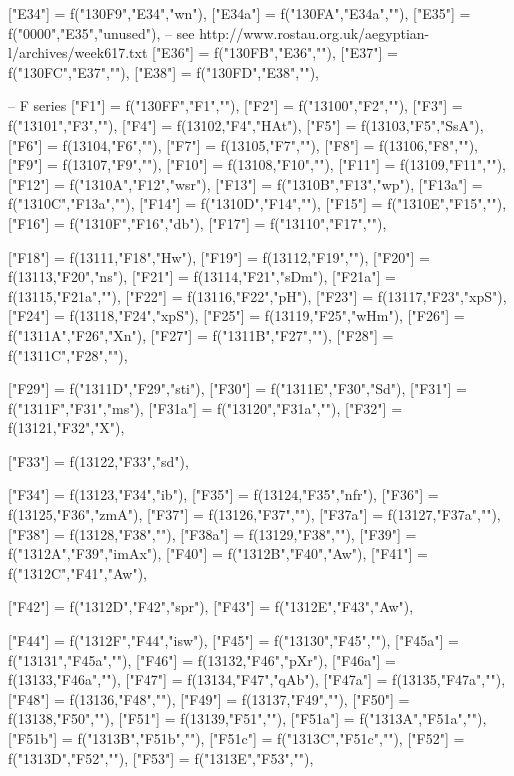 \documentclass{article}
\begin{document}
\begin{luacode*}
{	["E34"] 		= f("130F9","E34","wn"),
	["E34a"] 		= f("130FA","E34a",""),
	["E35"] 		= f("0000","E35","unused"), -- see http://www.rostau.org.uk/aegyptian-l/archives/week617.txt
	["E36"] 		= f("130FB","E36",""),
	["E37"] 		= f("130FC","E37",""),
	["E38"] 		= f("130FD","E38",""),

-- F series
	["F1"] 		    = f("130FF","F1",""),
	["F2"] 		   = f("13100","F2",""),
	["F3"] 		   = f("13101","F3",""),
	["F4"] 		   = f(13102,"F4","HAt"),
	["F5"] 		   = f(13103,"F5","SsA"),
	["F6"] 		   = f(13104,"F6",""),
	["F7"] 		   = f(13105,"F7",""),
	["F8"] 		   = f(13106,"F8",""),
	["F9"] 		   = f(13107,"F9",""),
	["F10"] 		= f(13108,"F10",""),
	["F11"] 		= f(13109,"F11",""),
	["F12"] 		= f("1310A","F12","wsr"),
	["F13"] 		= f("1310B","F13","wp"),
	["F13a"] 		= f("1310C","F13a",""),
	["F14"] 		= f("1310D","F14",""),
	["F15"] 		= f("1310E","F15",""),
	["F16"] 		= f("1310F","F16","db"),
	["F17"] 		= f("13110","F17",""),

	["F18"] 		= f(13111,"F18","Hw"),
	["F19"] 		= f(13112,"F19",""),
	["F20"] 		= f(13113,"F20","ns"),
	["F21"] 		= f(13114,"F21","sDm"),
	["F21a"] 		= f(13115,"F21a",""),
	["F22"] 		= f(13116,"F22","pH"),
	["F23"]       = f(13117,"F23","xpS"),
	["F24"]       = f(13118,"F24","xpS"),
	["F25"]       = f(13119,"F25","wHm"),
	["F26"]       = f("1311A","F26","Xn"),
	["F27"]       = f("1311B","F27",""),
	["F28"]       = f("1311C","F28",""),

	["F29"]       = f("1311D","F29","sti"),
	["F30"]       = f("1311E","F30","Sd"),
	["F31"]       = f("1311F","F31","ms"),
    ["F31a"] = f("13120","F31a",""),
["F32"] = f(13121,"F32","X"),

	["F33"] = f(13122,"F33","sd"),

	["F34"] = f(13123,"F34","ib"),
	["F35"] = f(13124,"F35","nfr"),
	["F36"] = f(13125,"F36","zmA"),
	["F37"] = f(13126,"F37",""),
	["F37a"] = f(13127,"F37a",""),
	["F38"] = f(13128,"F38",""),
	["F38a"] = f(13129,"F38",""),
	["F39"] = f("1312A","F39","imAx"),
	["F40"] = f("1312B","F40","Aw"),
	["F41"] = f("1312C","F41","Aw"),

	["F42"] = f("1312D","F42","spr"),
	["F43"] = f("1312E","F43","Aw"),

	["F44"] = f("1312F","F44","isw"),
	["F45"] = f("13130","F45",""),
	["F45a"] = f("13131","F45a",""),
	["F46"] = f(13132,"F46","pXr"),
	["F46a"] = f(13133,"F46a",""),
	["F47"] = f(13134,"F47","qAb"),
	["F47a"] = f(13135,"F47a",""),
	["F48"] = f(13136,"F48",""),
	["F49"] = f(13137,"F49",""),
	["F50"] = f(13138,"F50",""),
	["F51"] = f(13139,"F51",""),
	["F51a"] = f("1313A","F51a",""),
	["F51b"] = f("1313B","F51b",""),
	["F51c"] = f("1313C","F51c",""),
	["F52"] = f("1313D","F52",""),
	["F53"] = f("1313E","F53",""),


}
\end{luacode*}
\end{document}
